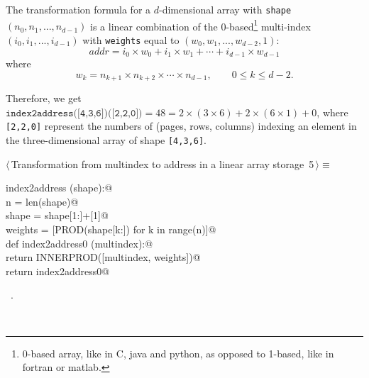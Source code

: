 \documentclass[11pt,oneside]{article}	%
\begin{document}
The transformation formula for a $d$-dimensional array with \texttt{shape} $(n_0,n_1,...,n_{d-1})$ is a linear combination of the 0-based\footnote{0-based array, like in C, java and python, as opposed to 1-based, like in fortran or matlab.} multi-index $(i_0,i_1,...,i_{d-1})$ with \texttt{weights} equal to $(w_0,w_1,...,w_{d-2},1)$:
\[
addr = i_0\times w_0 +i_1\times w_1 +\cdots +i_{d-1}\times w_{d-1}
\]
where 
\[
w_k = n_{k+1} \times n_{k+2} \times\cdots\times  n_{d-1}, \qquad 0\leq k\leq d-2.
\]

Therefore, we get $\texttt{index2address([4,3,6])([2,2,0])}=48= 2\times(3\times 6)+2\times(6\times 1)+0$,
where \texttt{[2,2,0]} represent the numbers of (pages, rows, columns) indexing an element in the three-dimensional array of shape \texttt{[4,3,6]}.

\begin{flushleft} \small
\begin{minipage}{\linewidth} \label{scrap6}
\protect{}$\langle\,$Transformation from multindex to address in a linear array storage\nobreak\ {\footnotesize 5}$\,\rangle\equiv$
\vspace{-1ex}
\begin{list}{}{} \item
\mbox{}\verb@def index2address (shape):@\\
\mbox{}\verb@    n = len(shape)@\\
\mbox{}\verb@    shape = shape[1:]+[1]@\\
\mbox{}\verb@    weights = [PROD(shape[k:]) for k in range(n)]@\\
\mbox{}\verb@    def index2address0 (multindex):@\\
\mbox{}\verb@        return INNERPROD([multindex, weights])@\\
\mbox{}\verb@    return index2address0@\\
\mbox{}\verb@@{\NWsep}
\end{list}
\vspace{-1ex}
\footnotesize\addtolength{\baselineskip}{-1ex}
\begin{list}{}{\setlength{\itemsep}{-\parsep}\setlength{\itemindent}{-\leftmargin}}
\item \NWtxtMacroRefIn\ .
\end{list}
\end{minipage}\\[4ex]
\end{flushleft}
\end{document}
